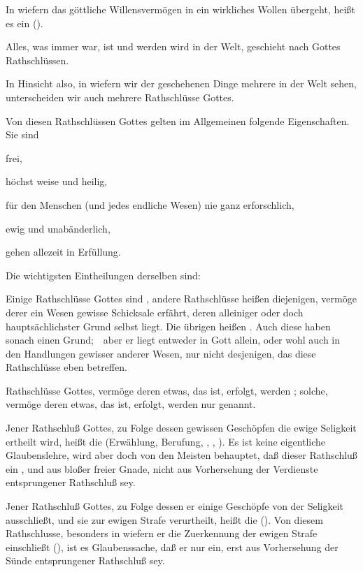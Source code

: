 \begin{aufza}
\item In wiefern das göttliche Willensvermögen in ein wirkliches Wollen übergeht, heißt es ein  ().
\item Alles, was immer war, ist und werden wird in der Welt, geschieht nach Gottes Rathschlüssen.
\item In  Hinsicht also, in wiefern wir der geschehenen Dinge mehrere in der Welt sehen, unterscheiden wir auch mehrere Rathschlüsse Gottes.
\item Von diesen Rathschlüssen Gottes gelten im Allgemeinen folgende Eigenschaften. Sie sind
\begin{aufzb}
\item frei,
\item höchst weise und heilig,
\item für den Menschen (und jedes endliche Wesen) nie ganz erforschlich,
\item ewig und unabänderlich,
\item gehen allezeit in Erfüllung.
\end{aufzb}
\item Die wichtigsten Eintheilungen derselben sind:
\begin{aufzb}
\item Einige Rathschlüsse Gottes sind , andere  Rathschlüsse heißen diejenigen, vermöge derer ein Wesen gewisse Schicksale erfährt, deren alleiniger oder doch hauptsächlichster Grund  selbst liegt. Die übrigen heißen . Auch diese haben sonach einen Grund;~\ aber er liegt entweder in Gott allein, oder wohl auch in den Handlungen gewisser anderer Wesen, nur nicht desjenigen, das diese Rathschlüsse eben betreffen.
\item Rathschlüsse Gottes, vermöge deren etwas, das  ist, erfolgt, werden ; solche, vermöge deren etwas, das  ist, erfolgt, werden nur  genannt.
\end{aufzb}
\item Jener Rathschluß Gottes, zu Folge dessen gewissen Geschöpfen die ewige Seligkeit ertheilt wird, heißt die  (Erwählung, Berufung, , , ). Es ist keine eigentliche Glaubenslehre, wird aber doch von den Meisten behauptet, daß dieser Rathschluß ein , und aus bloßer freier Gnade, nicht aus Vorhersehung der Verdienste entsprungener Rathschluß sey.
\item Jener Rathschluß Gottes, zu Folge dessen er einige Geschöpfe von der Seligkeit ausschließt, und sie zur ewigen Strafe verurtheilt, heißt die  (). Von diesem Rathschlusse, besonders in wiefern er die Zuerkennung der ewigen Strafe einschließt (), ist es Glaubenssache, daß er nur ein, erst aus Vorhersehung der Sünde entsprungener Rathschluß sey.
\end{aufza}


